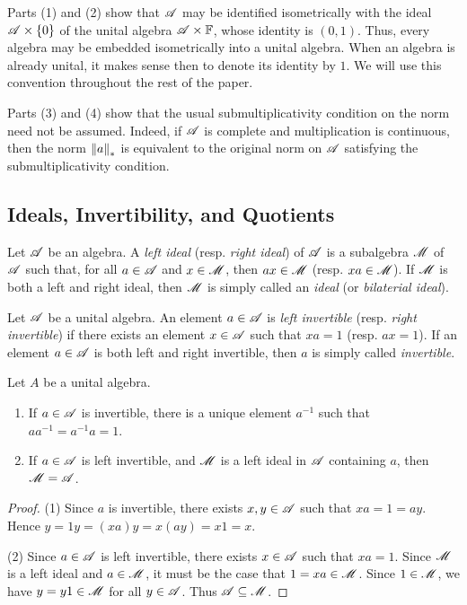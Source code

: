 Parts (1) and (2) show that $\mathscr{A}$ may be identified isometrically with the ideal $\mathscr{A} \times \{0\}$ of the unital algebra $\mathscr{A} \times \mathbb{F}$, whose identity is $(0,1)$. Thus, every algebra may be embedded isometrically into a unital algebra. When an algebra is already unital, it makes sense then to denote its identity by $1$. We will use this convention throughout the rest of the paper.

	Parts (3) and (4) show that the usual submultiplicativity condition on the norm need not be assumed. Indeed, if $\mathscr{A}$ is complete and multiplication is continuous, then the norm $\left\lVert a \right\rVert_{\ast}$ is equivalent to the original norm on $\mathscr{A}$ satisfying the submultiplicativity condition.

\subsection{Ideals, Invertibility, and Quotients}

\begin{definition}
	Let $\mathscr{A}$ be an algebra. A \emph{left ideal} (resp. \emph{right ideal}) of $\mathscr{A}$ is a subalgebra $\mathscr{M}$ of $\mathscr{A}$ such that, for all $a \in \mathscr{A}$ and $x \in \mathscr{M}$, then $ax \in \mathscr{M}$ (resp. $xa \in \mathscr{M}$). If $\mathscr{M}$ is both a left and right ideal, then $\mathscr{M}$ is simply called an \emph{ideal} (or \emph{bilaterial ideal}).
\end{definition}

\begin{definition}
	Let $\mathscr{A}$ be a unital algebra. An element $a \in \mathscr{A}$ is \emph{left invertible} (resp. \emph{right invertible}) if there exists an element $x \in \mathscr{A}$ such that $xa = 1$ (resp. $ax = 1$). If an element $a \in \mathscr{A}$ is both left and right invertible, then $a$ is simply called \emph{invertible}.
\end{definition}

\begin{proposition}\label{prop:ideals-and-inverts}
	Let $A$ be a unital algebra.
	\mbox{}
	\begin{enumerate}[label = (\arabic*),itemsep=1pt,topsep=3pt]
		\item If $a \in \mathscr{A}$ is invertible, there is a unique element $a^{-1}$ such that $a a^{-1} = a^{-1} a = 1$.
		\item If $a \in \mathscr{A}$ is left invertible, and $\mathscr{M}$ is a left ideal in $\mathscr{A}$ containing $a$, then $\mathscr{M} = \mathscr{A}$.
	\end{enumerate}
\end{proposition}
	\begin{proof}
		(1) Since $a$ is invertible, there exists $x,y \in \mathscr{A}$ such that $xa = 1 = ay$. Hence $y=1y=(xa)y = x(ay) = x1 = x$.

		(2) Since $a \in \mathscr{A}$ is left invertible, there exists $x \in \mathscr{A}$ such that $xa = 1$. Since $\mathscr{M}$ is a left ideal and $a \in \mathscr{M}$, it must be the case that $1 = xa \in \mathscr{M}$. Since $1 \in \mathscr{M}$, we have $y = y1 \in \mathscr{M}$ for all $y \in \mathscr{A}$. Thus $\mathscr{A} \subseteq \mathscr{M}$. 
	\end{proof}


